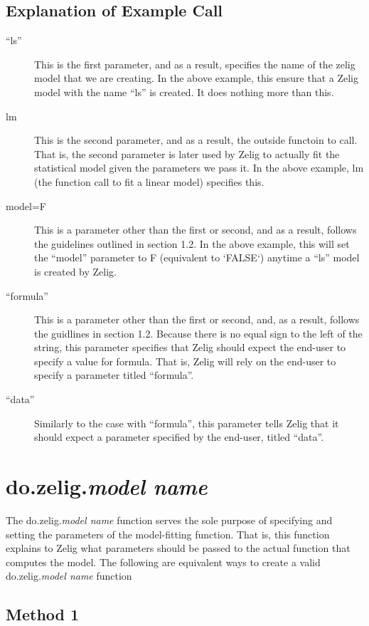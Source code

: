 \subsection{Explanation of Example Call}
\begin{description}
	\item[``ls'']{This is the first parameter, and as a result, specifies the name of the zelig model that we are creating.  In the above example, this ensure that a Zelig model with the name ``ls'' is created.  It does nothing more than this.}
	\item[lm]{This is the second parameter, and as a result, the outside functoin to call.  That is, the second parameter is later used by Zelig to actually fit the statistical model given the parameters we pass it.  In the above example, lm (the function call to fit a linear model) specifies this.}
	\item[model=F]{This is a parameter other than the first or second, and as a result, follows the guidelines outlined in section 1.2.  In the above example, this will set the ``model'' parameter to F (equivalent to `FALSE`) anytime a ``ls'' model is created by Zelig.}
	\item[``formula'']{This is a parameter other than the first or second, and, as a result, follows the guidlines in section 1.2.  Because there is no equal sign to the left of the string, this parameter specifies that Zelig should expect the end-user to specify a value for formula.  That is, Zelig will rely on the end-user to specify a parameter titled ``formula''.}
	\item[``data'']{Similarly to the case with ``formula'', this parameter tells Zelig that it should expect a parameter specified by the end-user, titled ``data''.}
\end{description}

\section{do.zelig.\emph{model name}}

The do.zelig.\emph{model name} function serves the sole purpose of specifying and setting the parameters of the model-fitting function.  That is, this function explains to Zelig what parameters should be passed to the actual function that computes the model.  The following are equivalent ways to create a valid do.zelig.\emph{model name} function

\subsection*{Method 1}


